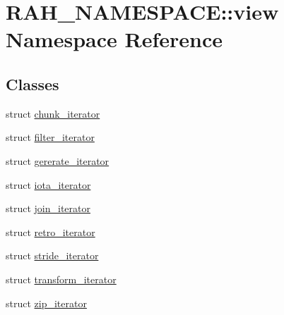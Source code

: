 \hypertarget{namespace_r_a_h___n_a_m_e_s_p_a_c_e_1_1view}{}\section{R\+A\+H\+\_\+\+N\+A\+M\+E\+S\+P\+A\+CE\+::view Namespace Reference}
\label{namespace_r_a_h___n_a_m_e_s_p_a_c_e_1_1view}
\subsection*{Classes}
\begin{DoxyCompactItemize}
\item 
struct \mbox{\hyperlink{struct_r_a_h___n_a_m_e_s_p_a_c_e_1_1view_1_1chunk__iterator}{chunk\+\_\+iterator}}
\item 
struct \mbox{\hyperlink{struct_r_a_h___n_a_m_e_s_p_a_c_e_1_1view_1_1filter__iterator}{filter\+\_\+iterator}}
\item 
struct \mbox{\hyperlink{struct_r_a_h___n_a_m_e_s_p_a_c_e_1_1view_1_1gererate__iterator}{gererate\+\_\+iterator}}
\item 
struct \mbox{\hyperlink{struct_r_a_h___n_a_m_e_s_p_a_c_e_1_1view_1_1iota__iterator}{iota\+\_\+iterator}}
\item 
struct \mbox{\hyperlink{struct_r_a_h___n_a_m_e_s_p_a_c_e_1_1view_1_1join__iterator}{join\+\_\+iterator}}
\item 
struct \mbox{\hyperlink{struct_r_a_h___n_a_m_e_s_p_a_c_e_1_1view_1_1retro__iterator}{retro\+\_\+iterator}}
\item 
struct \mbox{\hyperlink{struct_r_a_h___n_a_m_e_s_p_a_c_e_1_1view_1_1stride__iterator}{stride\+\_\+iterator}}
\item 
struct \mbox{\hyperlink{struct_r_a_h___n_a_m_e_s_p_a_c_e_1_1view_1_1transform__iterator}{transform\+\_\+iterator}}
\item 
struct \mbox{\hyperlink{struct_r_a_h___n_a_m_e_s_p_a_c_e_1_1view_1_1zip__iterator}{zip\+\_\+iterator}}
\end{DoxyCompactItemize}
